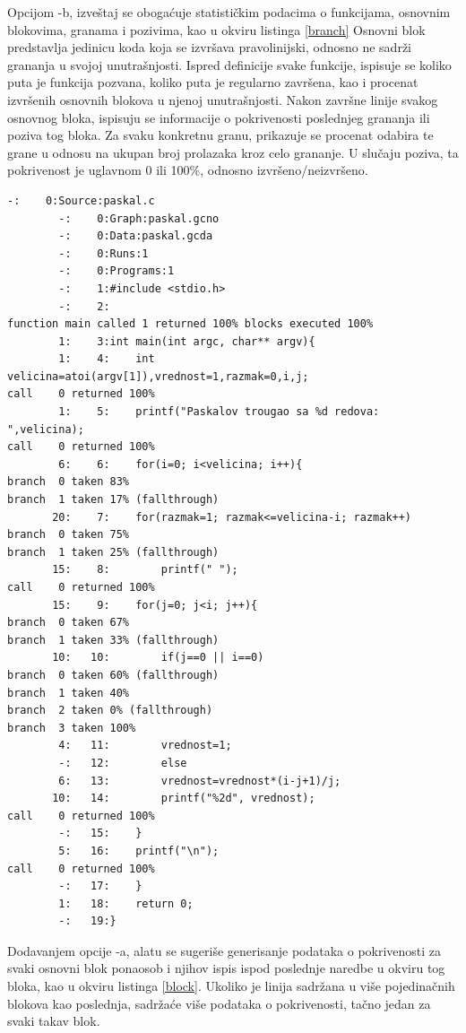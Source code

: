 \documentclass[12pt,oneside]{memoir}
\newcommand{\strano}[1]{\textit{#1}}
\begin{document}
Opcijom -b, izveštaj se obogaćuje statističkim podacima o funkcijama, osnovnim blokovima, granama i pozivima, kao u okviru listinga \ref{branch} Osnovni blok predstavlja jedinicu koda koja se izvršava pravolinijski, odnosno ne sadrži grananja u svojoj unutrašnjosti. Ispred definicije svake funkcije, ispisuje se koliko puta je funkcija pozvana, koliko puta je regularno završena, kao i procenat izvršenih osnovnih blokova u njenoj unutrašnjosti. Nakon završne linije svakog osnovnog bloka, ispisuju se informacije o pokrivenosti poslednjeg grananja ili poziva tog bloka. Za svaku konkretnu granu, prikazuje se procenat odabira te grane u odnosu na ukupan broj prolazaka kroz celo grananje. U slučaju poziva, ta pokrivenost je uglavnom 0 ili 100\%, odnosno izvršeno/neizvršeno. 

\newpage
\begin{lstlisting}[caption={Primer izveštaja koji generiše alat \strano{gcov} sa opcijom -b},frame=single, label=branch]
        -:    0:Source:paskal.c
        -:    0:Graph:paskal.gcno
        -:    0:Data:paskal.gcda
        -:    0:Runs:1
        -:    0:Programs:1
        -:    1:#include <stdio.h>
        -:    2:
function main called 1 returned 100% blocks executed 100%
        1:    3:int main(int argc, char** argv){
        1:    4:    int velicina=atoi(argv[1]),vrednost=1,razmak=0,i,j;
call    0 returned 100%
        1:    5:    printf("Paskalov trougao sa %d redova: ",velicina);
call    0 returned 100%
        6:    6:    for(i=0; i<velicina; i++){
branch  0 taken 83%
branch  1 taken 17% (fallthrough)
       20:    7:	for(razmak=1; razmak<=velicina-i; razmak++)
branch  0 taken 75%
branch  1 taken 25% (fallthrough)
       15:    8:	    printf(" ");
call    0 returned 100%
       15:    9:	for(j=0; j<i; j++){
branch  0 taken 67%
branch  1 taken 33% (fallthrough)
       10:   10:	    if(j==0 || i==0)
branch  0 taken 60% (fallthrough)
branch  1 taken 40%
branch  2 taken 0% (fallthrough)
branch  3 taken 100%
        4:   11:		vrednost=1;
        -:   12:	    else
        6:   13:		vrednost=vrednost*(i-j+1)/j;
       10:   14:	    printf("%2d", vrednost);
call    0 returned 100%
        -:   15:	}
        5:   16:	printf("\n");
call    0 returned 100%
        -:   17:    }
        1:   18:    return 0;
        -:   19:}
\end{lstlisting}

Dodavanjem opcije -a, alatu se sugeriše generisanje podataka o pokrivenosti za svaki osnovni blok ponaosob i njihov ispis ispod poslednje naredbe u okviru tog bloka, kao u okviru listinga \ref{block}. Ukoliko je linija sadržana u više pojedinačnih blokova kao poslednja, sadržaće više podataka o pokrivenosti, tačno jedan za svaki takav blok. 
\end{document}
